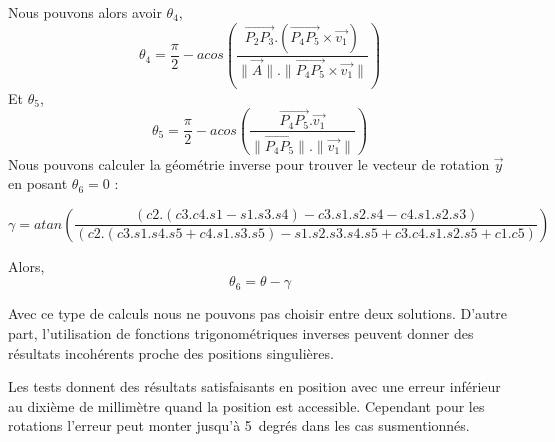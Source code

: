 \noindent 
Nous pouvons alors avoir $\theta_4$, 
$$\theta_4 = \frac{\pi}{2} - acos( \frac{\overrightarrow{P_2P_3}.(\overrightarrow{P_4P_5} \times \vec{v_1})}{\|\vec{A}\|.\|\overrightarrow{P_4P_5} \times \vec{v_1}\|} )$$
Et $\theta_5$, 
$$\theta_5 = \frac{\pi}{2} - acos( \frac{\overrightarrow{P_4P_5}.\vec{v_1}}{\|\overrightarrow{P_4P_5}\|.\|\vec{v_1}\|})$$
Nous pouvons calculer la g\'eom\'etrie inverse pour trouver le vecteur de rotation $\vec{y}$ en posant $\theta_6 = 0$ :
\begin{small}
$$\gamma = atan \left( \frac{(c2 . (c3 . c4 . s1 - s1 . s3 . s4) - c3 . s1 . s2 . s4 - c4 . s1 . s2 . s3)}{(c2 . (c3 . s1 . s4 . s5 + c4 . s1 . s3 . s5) - s1 . s2 . s3 . s4 . s5 + c3 . c4 . s1 . s2 . s5 + c1 . c5)}\right)$$
\end{small}
Alors,
$$ \theta_6 = \theta - \gamma$$

Avec ce type de calculs nous ne pouvons pas choisir entre deux solutions. D'autre part, l'utilisation de fonctions trigonom\'etriques inverses peuvent donner des r\'esultats incoh\'erents proche des positions singuli\`eres.
\saut

Les tests donnent des r\'esultats satisfaisants en position avec une erreur inf\'erieur au dixi\`eme de millim\`etre quand la position est accessible.
Cependant pour les rotations l'erreur peut monter jusqu'\`a 5~degr\'es dans les cas susmentionn\'es.
